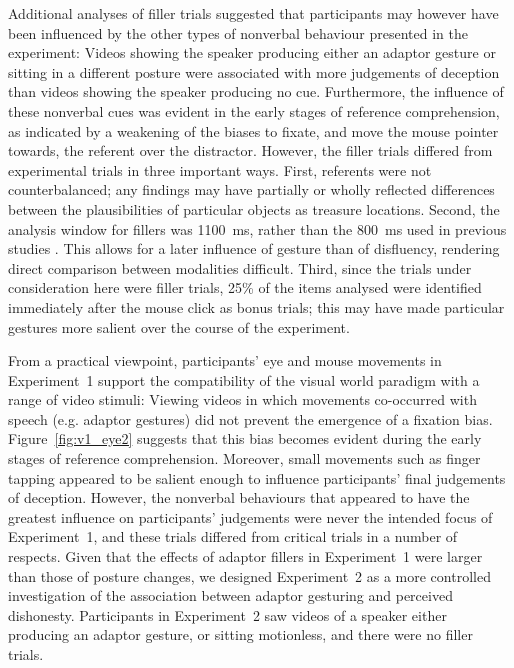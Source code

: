 \documentclass[a4paper,man,natbib]{apa6}
\let\oldtodo\todo
\renewcommand*{\todo}[1]{\oldtodo[fancyline]{#1}}
\begin{document}
Additional analyses of filler trials suggested that participants may however have been influenced by the other types of nonverbal behaviour presented in the experiment: Videos showing the speaker producing either an adaptor gesture or sitting in a different posture were associated with more judgements of deception than videos showing the speaker producing no cue.
Furthermore, the influence of these nonverbal cues was evident in the early stages of reference comprehension, as indicated by a weakening of the biases to fixate, and move the mouse pointer towards, the referent over the distractor. 
However, the filler trials differed from experimental trials in three important ways.
First, referents were not counterbalanced; any findings may have partially or wholly reflected differences between the plausibilities of particular objects as treasure locations.
Second, the analysis window for fillers was 1100~ms, rather than the 800~ms used in previous studies \citep[and for the critical items in the current experiment;][]{King2017,Loy2017}.
This allows for a later influence of gesture than of disfluency, rendering direct comparison between modalities difficult.\todo{I'm sure the case could be strengthened}
Third, since the trials under consideration here were filler trials, 25\% of the items analysed were identified immediately after the mouse click as bonus trials; this may have made particular gestures more salient over the course of the experiment.

From a practical viewpoint, participants' eye  and mouse movements in Experiment~1 support the compatibility of the visual world paradigm with a range of video stimuli: Viewing videos in which movements co-occurred with speech (e.g. adaptor gestures) did not prevent the emergence of a fixation bias.
Figure~\ref{fig:v1_eye2} suggests that this bias becomes evident during the early stages of reference comprehension.
Moreover, small movements such as finger tapping appeared to be salient enough to influence participants' final judgements of deception.
However, the nonverbal behaviours that appeared to  have the greatest influence on participants' judgements were never the intended focus of Experiment~1, and these trials differed from critical trials in a number of respects.
Given that the effects of adaptor fillers in Experiment~1 were larger than those of posture changes,\todo{enough?} we designed Experiment~2 as a more controlled investigation of the association between adaptor gesturing and perceived dishonesty.
Participants in Experiment~2 saw videos of a speaker either producing an adaptor gesture, or sitting motionless, and there were no filler trials.
\end{document}

